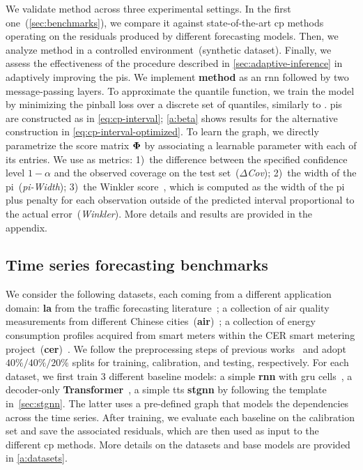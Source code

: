 We validate \gls{method} across three experimental settings. In the first one~(\autoref{sec:benchmarks}), we compare it against state-of-the-art \gls{cp} methods operating on the residuals produced by different forecasting models. Then, we analyze \gls{method} in a controlled environment~(synthetic dataset). Finally, we assess the effectiveness of the procedure described in \autoref{sec:adaptive-inference} in adaptively improving the \glspl{pi}.
We implement \textbf{\gls{method}} as an \gls{rnn} followed by two message-passing layers. To approximate the quantile function, we train the model by minimizing the pinball loss over a discrete set of quantiles, similarly to \citet{wen2017multi}. \glspl{pi} are constructed as in \autoref{eq:cp-interval}; \autoref{a:beta} shows results for the alternative construction in \autoref{eq:cp-interval-optimized}. To learn the graph, we directly parametrize the score matrix ${\bm{\Phi}}$ by associating a learnable parameter with each of its entries.
We use as metrics: 1)~the difference between the specified confidence level $1-\alpha$ and the observed coverage on the test set~(\textit{$\Delta$Cov}); 2)~the width of the \gls{pi}~(\textit{\gls{pi}-Width}); 3)~the Winkler score~\cite{winkler1972decision}, which is computed as the width of the \gls{pi} plus penalty for each observation outside of the predicted interval proportional to the actual error~(\textit{Winkler}). More details and results are provided in the appendix.


\subsection{Time series forecasting benchmarks}\label{sec:benchmarks}\label{s:benchmark}

We consider the following datasets, each coming from a different application domain: 
\textbf{\gls{la}} from the traffic forecasting literature~\cite{li2018diffusion}; a collection of air quality measurements from different Chinese cities~(\textbf{\gls{air}})~\cite{zheng2015forecasting}; a collection of energy consumption profiles acquired from smart meters within the CER smart metering project~(\textbf{\gls{cer}})~\cite{cer2016cer, cini2022filling}. 
We follow the preprocessing steps of previous works~\cite{li2018diffusion, wu2019graph, cini2023taming} and adopt $40\%/40\%/20\%$ splits for training, calibration, and testing, respectively. 
For each dataset, we first train $3$ different baseline models: a simple \textbf{\gls{rnn}} with \gls{gru} cells~\cite{cho2014properties}, a decoder-only \textbf{Transformer}~\cite{vaswani2017attention}, a simple \gls{tts} \textbf{\gls{stgnn}} by following the template in~\autoref{sec:stgnn}.
The latter uses a pre-defined graph that models the dependencies across the time series.
After training, we evaluate each baseline on the calibration set and save the associated residuals, which are then used as input to the different \gls{cp} methods. More details on the datasets and base models are provided in \autoref{a:datasets}.

